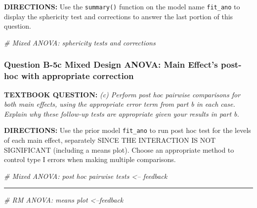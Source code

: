 \documentclass[
]{article}
\newenvironment{Shaded}{\begin{snugshade}}{\end{snugshade}}
\newcommand{\CommentTok}[1]{\textcolor[rgb]{0.56,0.35,0.01}{\textit{#1}}}
\begin{document}
\clearpage

\textbf{DIRECTIONS:} Use the \texttt{summary()} function on the model
name \texttt{fit\_ano} to display the sphericity test and corrections to
answer the last portion of this question.

\begin{Shaded}
\begin{Highlighting}[]
\CommentTok{# Mixed ANOVA: sphericity tests and corrections}
\end{Highlighting}
\end{Shaded}

\clearpage

\hypertarget{question-b-5c-mixed-design-anova-main-effects-post-hoc-with-appropriate-correction}{%
\subsubsection{Question B-5c Mixed Design ANOVA: Main Effect's post-hoc
with appropriate
correction}\label{question-b-5c-mixed-design-anova-main-effects-post-hoc-with-appropriate-correction}}

\textbf{TEXTBOOK QUESTION:} \emph{(c) Perform post hoc pairwise
comparisons for both main effects, using the appropriate error term from
part b in each case. Explain why these follow-up tests are appropriate
given your results in part b.}

\textbf{DIRECTIONS:} Use the prior model \texttt{fit\_ano} to run post
hoc test for the levels of each main effect, separately SINCE THE
INTERACTION IS NOT SIGNIFICANT (including a means plot). Choose an
appropriate method to control type I errors when making multiple
comparisons.

\begin{Shaded}
\begin{Highlighting}[]
\CommentTok{# Mixed ANOVA: post hoc pairwise tests <-- feedback}
\end{Highlighting}
\end{Shaded}

\begin{center}\rule{0.5\linewidth}{\linethickness}\end{center}

\begin{Shaded}
\begin{Highlighting}[]
\CommentTok{# RM ANOVA: means plot <--feedback}
\end{Highlighting}
\end{Shaded}

\clearpage
\end{document}
